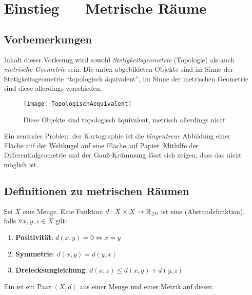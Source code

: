 \chapter{Einstieg --- Metrische Räume}

\section{Vorbemerkungen}

Inhalt dieser Vorlesung wird sowohl \emph{Stetigkeitsgeometrie} (Topologie) als auch \emph{metrische Geometrie} sein. Die unten abgebildeten Objekte sind im Sinne der Stetigkeitsgeometrie ``topologisch äquivalent'', im Sinne der metrischen Geometrie sind diese allerdings verschieden.

\begin{figure}[H]
  \texttt{[image: TopologischAequivalent]}
  \caption{Diese Objekte sind topologisch äquivalent, metrisch allerdings nicht}
\end{figure}

\begin{remark}[Kartographieproblem]
  Ein zentrales Problem der Kartographie ist die \emph{längentreue} Abbildung einer Fläche auf der Weltkugel auf eine Fläche auf Papier. Mithilfe der Differentialgeometrie und der Gauß-Krümmung lässt sich zeigen, dass das nicht möglich ist.
\end{remark}

\section{Definitionen zu metrischen Räumen}

\begin{definition}[Metrik]\label{def:metrik}
  Sei \( X \) eine Menge. Eine Funktion \( d: X \times X \to \mathbb{R}_{\geq 0} \) ist eine  (Abstandsfunktion), falls \( \forall x, y, z \in X \) gilt:
  \begin{enumerate}
    \item \textbf{Positivität}: \( d(x, y) = 0 \Leftrightarrow x = y \) 
    \item \textbf{Symmetrie}: \( d(x,y) = d(y,x) \)
    \item \textbf{Dreiecksungleichung}: \( d(x,z) \leq d(x,y) + d(y,z) \)
  \end{enumerate}
\end{definition}

\begin{definition}\label{def:metrischerRaum}
  Ein  ist ein Paar \( (X,d) \) aus einer Menge und einer Metrik auf dieser.
\end{definition}

